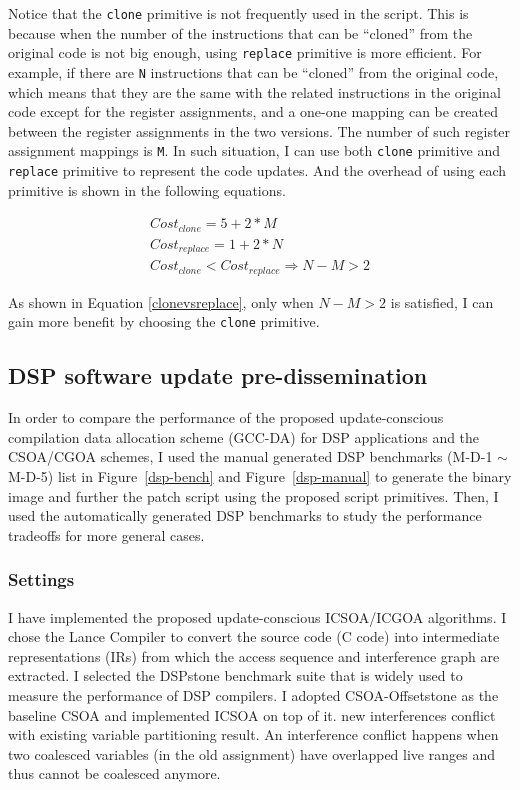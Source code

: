 Notice that the {\tt clone} primitive is not frequently used in the script. This is because when the number of the 
instructions that can be ``cloned'' from the original code is not big enough, using {\tt replace} primitive is more 
efficient. For example, if there are {\tt N} instructions that can be ``cloned'' from the original code, which means 
that they are the same with the related instructions in the original code except for the register assignments, and a 
one-one mapping can be created between the register assignments in the two versions. The number of such register 
assignment mappings is {\tt M}. 
In such situation, I can use both {\tt clone} primitive and {\tt replace} primitive to represent the code updates. And 
the overhead of using each primitive is shown in the following equations.

\begin{small}
\begin{eqnarray}
Cost_{clone} = 5 + 2*M\\
Cost_{replace} = 1 + 2*N\\
Cost_{clone} < Cost_{replace} \Rightarrow N-M > 2
\label{clonevsreplace}
\end{eqnarray}
\end{small}

As shown in Equation \ref{clonevsreplace}, only when $N-M > 2$ is satisfied, I can gain more benefit by choosing the 
{\tt clone} primitive.

\subsection{DSP software update pre-dissemination}

In order to compare the performance of the proposed update-conscious compilation data
allocation scheme (GCC-DA) for DSP applications and the CSOA/CGOA schemes, I used the manual generated DSP
benchmarks (M-D-1 $\sim$ M-D-5)
list in Figure~\ref{dsp-bench} and Figure~\ref{dsp-manual} to generate the binary image
and further the patch script using the proposed script primitives.
Then, I used the automatically generated DSP benchmarks to study the performance tradeoffs
for more general cases.

\subsubsection{Settings}
I have implemented the proposed update-conscious ICSOA/ICGOA algorithms. I chose the Lance Compiler\cite{lance} to 
convert the source code (C code) into intermediate representations (IRs) from which the access sequence and 
interference graph are extracted. I selected the DSPstone\cite{dspstone} benchmark suite that is widely used to measure 
the performance of DSP compilers. I adopted CSOA-Offsetstone\cite{offsetstone} as the baseline CSOA and implemented 
ICSOA on top of it. 
%
new interferences conflict with existing variable partitioning result. An interference conflict happens when two 
coalesced variables (in the old assignment) have overlapped live ranges and thus cannot be coalesced anymore.


